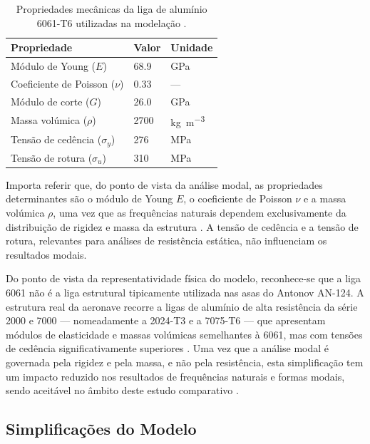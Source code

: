 \documentclass[11pt,twoside,a4paper]{report}
\begin{document}
\begin{table}[h!]
\centering
\caption{Propriedades mecânicas da liga de alumínio 6061-T6 utilizadas 
na modelação \cite{ASM2008, Nastran2014}.}
\label{tab:al6061}
\renewcommand{\arraystretch}{1.4}
\begin{tabularx}{\textwidth}{p{5.5cm} p{3cm} X}
\toprule
\textbf{Propriedade} & \textbf{Valor} & \textbf{Unidade} \\
\midrule
Módulo de Young ($E$)           & 68.9        & \si{\giga\pascal} \\
Coeficiente de Poisson ($\nu$)  & 0.33        & --- \\
Módulo de corte ($G$)           & 26.0        & \si{\giga\pascal} \\
Massa volúmica ($\rho$)         & 2700        & \si{\kilo\gram\per\cubic\meter} \\
Tensão de cedência ($\sigma_y$) & 276         & \si{\mega\pascal} \\
Tensão de rotura ($\sigma_u$)   & 310         & \si{\mega\pascal} \\
\bottomrule
\end{tabularx}
\end{table}

Importa referir que, do ponto de vista da análise modal, as propriedades determinantes são o módulo de Young $E$, o coeficiente de Poisson $\nu$ e a massa volúmica $\rho$, uma vez que as frequências naturais dependem exclusivamente da distribuição de rigidez e massa da estrutura \cite{Craig2006}. A tensão de cedência e a tensão de rotura, relevantes para análises de resistência estática, não influenciam os resultados modais.

Do ponto de vista da representatividade física do modelo, reconhece-se que a liga 6061 não é a liga estrutural tipicamente utilizada nas asas do Antonov AN-124. A estrutura real da aeronave recorre a ligas de alumínio de alta resistência da série 2000 e 7000 --- nomeadamente a 2024-T3 e a 7075-T6 --- que apresentam módulos de elasticidade e massas volúmicas semelhantes à 6061, mas com tensões de cedência significativamente superiores \cite{Megson2012}. Uma vez que a análise modal é governada pela rigidez e pela massa, e não pela resistência, esta simplificação tem um impacto reduzido nos resultados de frequências naturais e formas modais, sendo aceitável no âmbito deste estudo comparativo \cite{Wright2015}.

\subsection{Simplificações do Modelo}
\end{document}
